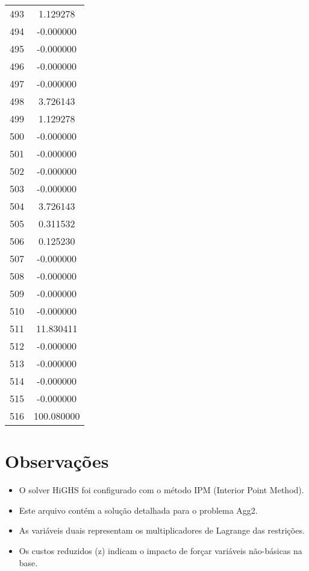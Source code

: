 \documentclass[12pt]{article}
\begin{document}
\begin{longtable}{@{}cc@{}}
493 & 1.129278 \\
494 & -0.000000 \\
495 & -0.000000 \\
496 & -0.000000 \\
497 & -0.000000 \\
498 & 3.726143 \\
499 & 1.129278 \\
500 & -0.000000 \\
501 & -0.000000 \\
502 & -0.000000 \\
503 & -0.000000 \\
504 & 3.726143 \\
505 & 0.311532 \\
506 & 0.125230 \\
507 & -0.000000 \\
508 & -0.000000 \\
509 & -0.000000 \\
510 & -0.000000 \\
511 & 11.830411 \\
512 & -0.000000 \\
513 & -0.000000 \\
514 & -0.000000 \\
515 & -0.000000 \\
516 & 100.080000 \\

\end{longtable}


\section{Observações}

\begin{itemize}
\item O solver HiGHS foi configurado com o método IPM (Interior Point Method).
\item Este arquivo contém a solução detalhada para o problema Agg2.
\item As variáveis duais representam os multiplicadores de Lagrange das restrições.
\item Os custos reduzidos (z) indicam o impacto de forçar variáveis não-básicas na base.
\end{itemize}
\end{document}
